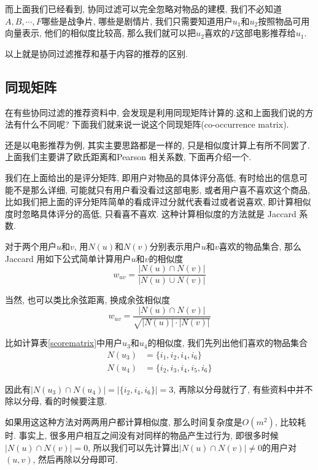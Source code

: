 \documentclass[a4paper,UTF8]{ctexart}
\theoremstyle{plain} \newtheorem{theorem}{定理}[section]
\theoremstyle{plain} \newtheorem{definition}{定义}[section]
\theoremstyle{plain} \newtheorem{lemma}{引理}[section]
\theoremstyle{plain} \newtheorem{proposition}{命题}[section]
\theoremstyle{plain} \newtheorem{example}{例}[section]
\theoremstyle{plain} \newtheorem{remark}{注}[section]
\theoremstyle{plain} \newtheorem{corollary}{推论}[section]
\begin{document}
而上面我们已经看到, 协同过滤可以完全忽略对物品的建模, 我们不必知道$A,B,\cdots,F$哪些是战争片, 哪些是剧情片, 我们只需要知道用户$u_{1}$和$u_{2}$按照物品可用向量表示, 他们的相似度比较高, 那么我们就可以把$u_{2}$喜欢的$F$这部电影推荐给$u_{1}$.

以上就是协同过滤推荐和基于内容的推荐的区别.


\subsection{同现矩阵}
在有些协同过滤的推荐资料中, 会发现是利用同现矩阵计算的.这和上面我们说的方法有什么不同呢? 下面我们就来说一说这个同现矩阵(co-occurrence matrix).

还是以电影推荐为例, 其实主要思路都是一样的, 只是相似度计算上有所不同罢了. 上面我们主要讲了欧氏距离和Pearson 相关系数, 下面再介绍一个.

我们在上面给出的是评分矩阵, 即用户对物品的具体评分高低, 有时给出的信息可能不是那么详细, 可能就只有用户看没看过这部电影, 或者用户喜不喜欢这个商品, 比如我们把上面的评分矩阵简单的看成评过分就代表看过或者说喜欢, 即计算相似度时忽略具体评分的高低, 只看喜不喜欢. 这种计算相似度的方法就是 Jaccard 系数. 

对于两个用户$u$和$v$, 用$N(u)$和$N(v)$分别表示用户$u$和$v$喜欢的物品集合, 那么 Jaccard 用如下公式简单计算用户$u$和$v$的相似度
\begin{equation*}
w_{uv} = \frac{|N(u) \cap N(v)|}{|N(u) \cup N(v)|}
\end{equation*}

当然, 也可以类比余弦距离, 换成余弦相似度
\begin{equation*}
w_{uv} = \frac{|N(u) \cap N(v)|}{\sqrt{|N(u)| \cdot |N(v)|}}
\end{equation*}

比如计算表\ref{scorematrix}中用户$u_3$和$u_4$的相似度, 我们先列出他们喜欢的物品集合
\begin{align*}
N(u_3) & = \{i_1, i_2, i_4, i_6\} \\ 
N(u_4) & = \{i_2, i_3, i_4, i_5, i_6\}
\end{align*}

因此有$|N(u_3) \cap N(u_4)| = |\{i_2,i_4,i_6\}| = 3$, 再除以分母就行了, 有些资料中并不除以分母, 看的时候要注意.

如果用这这种方法对两两用户都计算相似度, 那么时间复杂度是$O(m^2)$, 比较耗时. 事实上, 很多用户相互之间没有对同样的物品产生过行为, 即很多时候$|N(u) \cap N(v)| = 0$, 所以我们可以先计算出$|N(u) \cap N(v)| \neq 0$的用户对$(u,v)$, 然后再除以分母即可.
\end{document}
